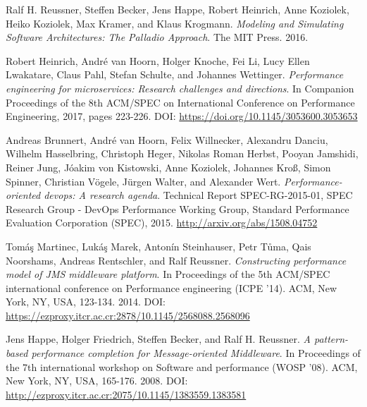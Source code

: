 \documentclass[conference]{IEEEtran}
\begin{document}
\begin{thebibliography}{00}

 Ralf H. Reussner, Steffen Becker, Jens Happe, Robert Heinrich, Anne Koziolek, Heiko Koziolek, Max Kramer, and Klaus Krogmann. \emph{Modeling and Simulating Software Architectures: The Palladio Approach}. The MIT Press. 2016.

 Robert Heinrich, André van Hoorn, Holger Knoche, Fei Li, Lucy Ellen Lwakatare, Claus Pahl, Stefan Schulte, and Johannes Wettinger. \emph{Performance engineering for microservices: Research challenges and directions}. In Companion Proceedings of the 8th ACM/SPEC on International Conference on Performance Engineering, 2017, pages 223-226. DOI: \url{https://doi.org/10.1145/3053600.3053653}

 Andreas Brunnert, André van Hoorn, Felix Willnecker, Alexandru Danciu, Wilhelm Hasselbring, Christoph Heger, Nikolas Roman Herbst, Pooyan Jamshidi, Reiner Jung, Jóakim von Kistowski, Anne Koziolek, Johannes Kroß, Simon Spinner, Christian Vögele, Jürgen Walter, and Alexander Wert. \emph{Performance-oriented devops: A research agenda}. Technical Report SPEC-RG-2015-01, SPEC Research Group - DevOps Performance Working Group, Standard Performance Evaluation Corporation (SPEC), 2015. \url{http://arxiv.org/abs/1508.04752}

 Tomáş Martinec, Lukáş Marek, Antonín Steinhauser, Petr Tůma, Qais Noorshams, Andreas Rentschler, and Ralf Reussner. \emph{Constructing performance model of JMS middleware platform}. In Proceedings of the 5th ACM/SPEC international conference on Performance engineering (ICPE '14). ACM, New York, NY, USA, 123-134. 2014. DOI: \url{https://ezproxy.itcr.ac.cr:2878/10.1145/2568088.2568096}

 Jens Happe, Holger Friedrich, Steffen Becker, and Ralf H. Reussner. \emph{A pattern-based performance completion for Message-oriented Middleware}. In Proceedings of the 7th international workshop on Software and performance (WOSP '08). ACM, New York, NY, USA, 165-176. 2008. DOI: \url{http://ezproxy.itcr.ac.cr:2075/10.1145/1383559.1383581} 





\end{thebibliography}
\end{document}

